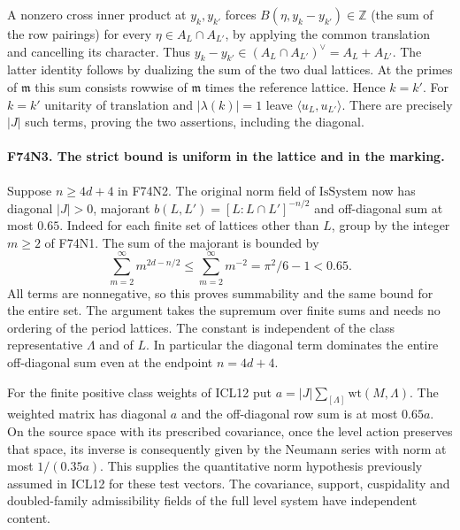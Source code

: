 A nonzero cross inner product at $y_k,y_{k'}$ forces
$B(\eta,y_k-y_{k'})\in\mathbb Z$ (the sum of the row pairings)
for every $\eta\in A_L\cap A_{L'}$,
by applying the common translation and cancelling its character.
Thus $y_k-y_{k'}\in(A_L\cap A_{L'})^\vee=A_L+A_{L'}$.
The latter identity follows by dualizing the sum of the two dual
lattices. At the primes of $\mathfrak m$ this sum consists rowwise
of $\mathfrak m$ times the reference lattice. Hence $k=k'$.
For $k=k'$ unitarity of translation and $|\lambda(k)|=1$ leave
$\langle u_L,u_{L'}\rangle$. There are precisely $|J|$ such
terms, proving the two assertions, including the diagonal.

\paragraph{F74N3. The strict bound is uniform in the lattice and in the marking.}
Suppose $n\ge 4d+4$ in F74N2. The original norm field of
$\mathrm{IsSystem}$ now has diagonal $|J|>0$, majorant
$b(L,L')=[L:L\cap L']^{-n/2}$ and off-diagonal sum at most $0.65$.
Indeed for each finite set of lattices other than $L$, group by the
integer $m\ge2$ of F74N1. The sum of the majorant is bounded by
\[
   \sum_{m=2}^{\infty} m^{2d-n/2}
       \le \sum_{m=2}^{\infty}m^{-2}
       =\pi^2/6-1<0.65 .
\]
All terms are nonnegative, so this proves summability and the same
bound for the entire set. The argument takes the supremum over
finite sums and needs no ordering of the period lattices. The
constant is independent of the class representative $\Lambda$
and of $L$. In particular the diagonal term dominates the entire
off-diagonal sum even at the endpoint $n=4d+4$.

For the finite positive class weights of ICL12 put
$a=|J|\sum_{[\Lambda]}\mathrm{wt}(M,\Lambda)$.
The weighted matrix has diagonal $a$ and the off-diagonal row sum
is at most $0.65a$. On the source space with its prescribed
covariance, once the level action preserves that space, its inverse
is consequently given by the Neumann series with norm at most
$1/(0.35a)$. This supplies the quantitative norm hypothesis
previously assumed in ICL12 for these test vectors. The covariance,
support, cuspidality and doubled-family admissibility fields of
the full level system have independent content.
